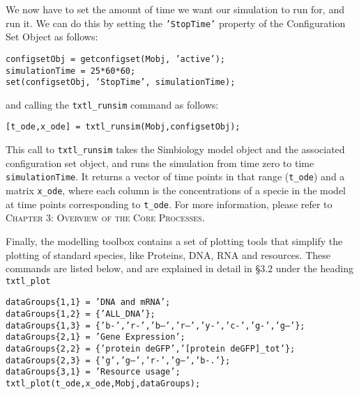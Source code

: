 \documentclass[english]{report}
\begin{document}
We now have to set the amount of time we want our simulation to run for, and run it. We can do this by setting the \texttt{'StopTime'} property of the Configuration Set Object as follows:

				\begin{flushleft}
						\texttt{configsetObj = getconfigset(Mobj, 'active');\\
simulationTime = 25*60*60;\\
set(configsetObj, 'StopTime', simulationTime);} \\	
				\end{flushleft}		
and calling the \texttt{txtl\_runsim} command as follows:	

				\begin{flushleft}
						\texttt{[t\_ode,x\_ode] = txtl\_runsim(Mobj,configsetObj);} \\	
				\end{flushleft}	
This call to \texttt{txtl\_runsim} takes the Simbiology model object and the associated configuration set object, and runs the simulation from time zero to time \texttt{simulationTime}. It returns a vector of time points in that range (\texttt{t\_ode}) and a matrix \texttt{x\_ode}, where each column is the concentrations of a specie in the model at time points corresponding to \texttt{t\_ode}. For more information, please refer to \textsc{Chapter 3: Overview of the Core Processes}. 

Finally, the modelling toolbox contains a set of plotting tools that simplify the plotting of standard species, like Proteins, DNA, RNA and resources. These commands are listed below, and are explained in detail in \S 3.2 under the heading \texttt{txtl\_plot}

				 \begin{flushleft}
						 \texttt{\noindent dataGroups\{1,1\} = 'DNA and mRNA'; \\
						dataGroups\{1,2\} = \{'ALL\_DNA'\};\\ 
						dataGroups\{1,3\} = \{'b-','r-','b--','r--','y-','c-','g-','g--'\};\\}
						\vspace*{1\baselineskip}
						\texttt{\noindent dataGroups\{2,1\} = 'Gene Expression';\\
						dataGroups\{2,2\} = \{'protein deGFP\textasteriskcentered','[protein deGFP]\_tot'\};\\
						dataGroups\{2,3\} = \{'g','g--','r-','g--','b-.'\};\\}
						\vspace*{1\baselineskip}
						\texttt{\noindent dataGroups\{3,1\} = 'Resource usage';\\}
						\vspace*{1\baselineskip}
						 \texttt{\noindent txtl\_plot(t\_ode,x\_ode,Mobj,dataGroups); \\}
					
				\end{flushleft}
						
\end{document}
